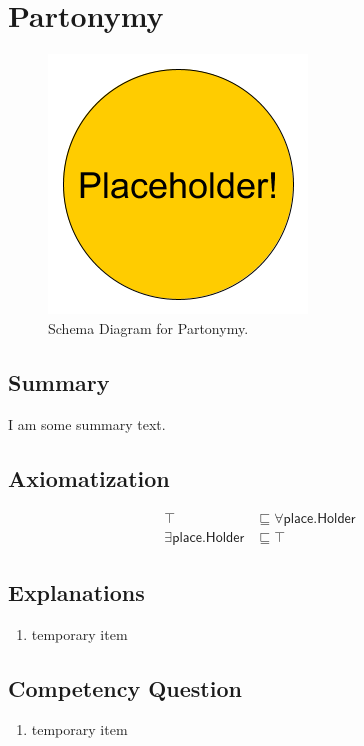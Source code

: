 \section{Partonymy}
\label{sec:Partonymy}
\begin{figure}[h!]
\begin{center}
\includegraphics[width=.4\textwidth]{figures/placeholder}
\end{center}
\caption{Schema Diagram for Partonymy.}
\label{fig:Partonymy}
\end{figure}
\subsection{Summary}
\label{sum:Partonymy}
I am some summary text.

\subsection{Axiomatization}
\label{axs:Partonymy}
\begin{align}
\top &\sqsubseteq \forall\textsf{place.Holder} \\ 
\exists\textsf{place.Holder} &\sqsubseteq \top 
\end{align}

\subsection{Explanations}
\label{exp:Partonymy}
\begin{enumerate}
\item temporary item
\end{enumerate}

\subsection{Competency Question}
\label{cqs:Partonymy}
\begin{enumerate}[CQ1.]
\item temporary item
\end{enumerate}

\newpage

